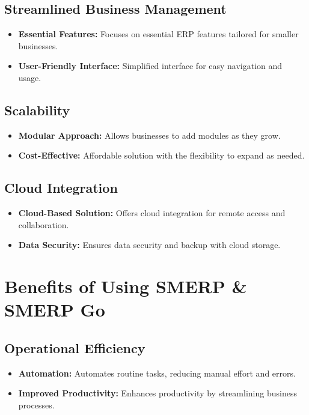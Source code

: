 \documentclass[a4paper,12pt]{report}
\begin{document}
	\subsection{Streamlined Business Management}
	\begin{itemize}
		\item \textbf{Essential Features:} Focuses on essential ERP features tailored for smaller businesses.
		\item \textbf{User-Friendly Interface:} Simplified interface for easy navigation and usage.
	\end{itemize}
	
	\subsection{Scalability}
	\begin{itemize}
		\item \textbf{Modular Approach:} Allows businesses to add modules as they grow.
		\item \textbf{Cost-Effective:} Affordable solution with the flexibility to expand as needed.
	\end{itemize}
	
	\subsection{Cloud Integration}
	\begin{itemize}
		\item \textbf{Cloud-Based Solution:} Offers cloud integration for remote access and collaboration.
		\item \textbf{Data Security:} Ensures data security and backup with cloud storage.
	\end{itemize}
	
	\section{Benefits of Using SMERP \& SMERP Go}
	
	\subsection{Operational Efficiency}
	\begin{itemize}
		\item \textbf{Automation:} Automates routine tasks, reducing manual effort and errors.
		\item \textbf{Improved Productivity:} Enhances productivity by streamlining business processes.
	\end{itemize}
	
\end{document}
